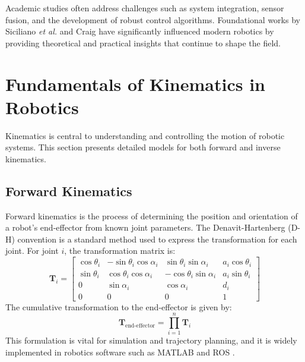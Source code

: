 Academic studies often address challenges such as system integration, sensor fusion, and the development of robust control algorithms. Foundational works by Siciliano \emph{et al.} \cite{Siciliano2009} and Craig \cite{Craig2005} have significantly influenced modern robotics by providing theoretical and practical insights that continue to shape the field.

\section{Fundamentals of Kinematics in Robotics}
Kinematics is central to understanding and controlling the motion of robotic systems. This section presents detailed models for both forward and inverse kinematics.

\subsection{Forward Kinematics}
Forward kinematics is the process of determining the position and orientation of a robot's end-effector from known joint parameters. The Denavit-Hartenberg (D-H) convention is a standard method used to express the transformation for each joint. For joint \( i \), the transformation matrix is:
\[
\mathbf{T}_i = \begin{bmatrix}
\cos\theta_i & -\sin\theta_i \cos\alpha_i & \sin\theta_i \sin\alpha_i & a_i \cos\theta_i \\
\sin\theta_i & \cos\theta_i \cos\alpha_i  & -\cos\theta_i \sin\alpha_i & a_i \sin\theta_i \\
0            & \sin\alpha_i              & \cos\alpha_i              & d_i \\
0            & 0                         & 0                         & 1
\end{bmatrix}
\]
The cumulative transformation to the end-effector is given by:
\[
\mathbf{T}_{\text{end-effector}} = \prod_{i=1}^{n} \mathbf{T}_i
\]
This formulation is vital for simulation and trajectory planning, and it is widely implemented in robotics software such as MATLAB and ROS \cite{Spong2006}.

